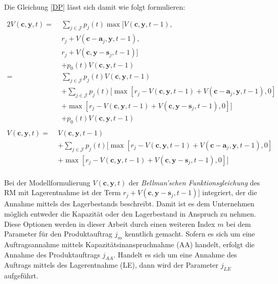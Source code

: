 Die Gleichung \eqref{DP} lässt sich damit wie folgt formulieren:

\begin{alignat*}{2}
V(\textbf{c}, \textbf{y}, t) =\;& \sum_{j \in \mathcal{J}}p_{j}(t)\max[V(\textbf{c}, \textbf{y}, t-1), \\
& r_{j} + V(\textbf{c}-\textbf{a}_j, \textbf{y}, t-1),\\
& r_{j} + V(\textbf{c}, \textbf{y}-\textbf{s}_j, t-1)] \\
& + p_{0}(t)V(\textbf{c}, \textbf{y}, t-1)\\[10pt] 
= \;& \sum_{j \in \mathcal{J}}p_{j}(t)V(\textbf{c}, \textbf{y}, t-1)\\
&+ \sum_{j \in \mathcal{J}}p_{j}(t)[\max[r_{j} - V(\textbf{c}, \textbf{y}, t-1)+ V(\textbf{c}-\textbf{a}_j, \textbf{y}, t-1),0]\\
&+ \max[r_{j} - V(\textbf{c}, \textbf{y}, t-1) + V(\textbf{c}, \textbf{y}-\textbf{s}_j, t-1),0]]\\
&+ p_{0}(t)V(\textbf{c}, \textbf{y}, t-1)\\
\end{alignat*}
\begin{equation}\label{stock}
\begin{alignat*}{2}
V(\textbf{c}, \textbf{y}, t) = \;& V(\textbf{c}, \textbf{y}, t-1)\\
&+ \sum_{j \in \mathcal{J}}p_{j}(t)[\max[r_{j} - V(\textbf{c}, \textbf{y}, t-1) + V(\textbf{c}-\textbf{a}_j, \textbf{y}, t-1),0]\\
&+ \max[r_{j} - V(\textbf{c}, \textbf{y}, t-1) + V(\textbf{c}, \textbf{y}-\textbf{s}_j, t-1),0]]\\
\end{alignat*}
\end{equation}




Bei der Modellformulierung $V(\textbf{c}, \textbf{y}, t)$ der \textit{Bellman'schen Funktionsgleichung} des RM mit Lagerentnahme ist der Term $ r_{j} + V(\textbf{c}, \textbf{y}-\textbf{s}_j, t-1)]$ integriert, der die Annahme mittels des Lagerbestands beschreibt. Damit ist es dem Unternehmen möglich entweder die Kapazität oder den Lagerbestand in Anspruch zu nehmen. Diese Optionen werden in dieser Arbeit durch einen weiteren Index $m$ bei dem Parameter für den Produktauftrag $j_{m}$ kenntlich gemacht. Sofern es sich um eine Auftragsannahme mittels Kapazitätsinanspruchnahme (AA) handelt, erfolgt die Annahme des Produktauftrags $j_{AA}$. Handelt es sich um eine Annahme des Auftrags mittels des Lagerentnahme (LE), dann wird der Parameter $j_{LE}$ aufgeführt.

